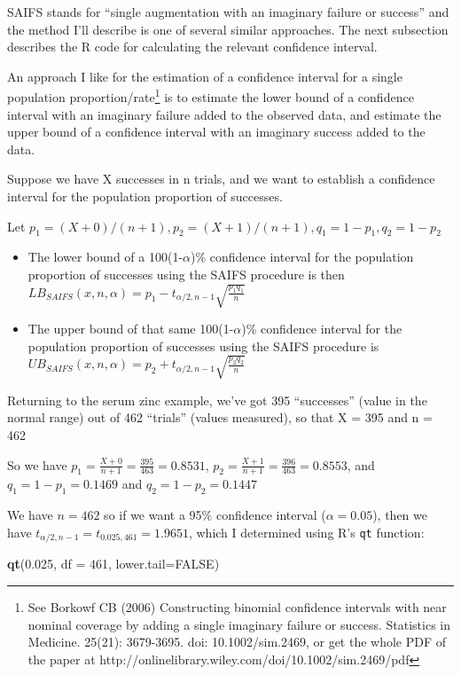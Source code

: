 \documentclass[
]{book}
\newenvironment{Shaded}{\begin{snugshade}}{\end{snugshade}}
\newcommand{\DataTypeTok}[1]{\textcolor[rgb]{0.13,0.29,0.53}{#1}}
\newcommand{\DecValTok}[1]{\textcolor[rgb]{0.00,0.00,0.81}{#1}}
\newcommand{\FloatTok}[1]{\textcolor[rgb]{0.00,0.00,0.81}{#1}}
\newcommand{\KeywordTok}[1]{\textcolor[rgb]{0.13,0.29,0.53}{\textbf{#1}}}
\newcommand{\NormalTok}[1]{#1}
\newcommand{\OtherTok}[1]{\textcolor[rgb]{0.56,0.35,0.01}{#1}}
\begin{document}
SAIFS stands for ``single augmentation with an imaginary failure or success'' and the method I'll describe is one of several similar approaches. The next subsection describes the R code for calculating the relevant confidence interval.

An approach I like for the estimation of a confidence interval for a single population proportion/rate\footnote{See Borkowf CB (2006) Constructing binomial confidence intervals with near nominal coverage by adding a single imaginary failure or success. Statistics in Medicine. 25(21): 3679-3695. doi: 10.1002/sim.2469, or get the whole PDF of the paper at http://onlinelibrary.wiley.com/doi/10.1002/sim.2469/pdf} is to estimate the lower bound of a confidence interval with an imaginary failure added to the observed data, and estimate the upper bound of a confidence interval with an imaginary success added to the data.

Suppose we have X successes in n trials, and we want to establish a confidence interval for the population proportion of successes.

Let \(p_1 = (X+0)/(n+1), p_2 = (X+1)/(n+1), q_1 = 1 - p_1, q_2 = 1 - p_2\)

\begin{itemize}
\item
  The lower bound of a 100(1-\(\alpha\))\% confidence interval for the population proportion of successes using the SAIFS procedure is then \(LB_{SAIFS}(x,n,\alpha) = p_1 - t_{\alpha/2, n-1}\sqrt{\frac{p_1 q_1}{n}}\)
\item
  The upper bound of that same 100(1-\(\alpha\))\% confidence interval for the population proportion of successes using the SAIFS procedure is \(UB_{SAIFS}(x,n,\alpha) = p_2 + t_{\alpha/2, n-1}\sqrt{\frac{p_2 q_2}{n}}\)
\end{itemize}

Returning to the serum zinc example, we've got 395 ``successes'' (value in the normal range) out of 462 ``trials'' (values measured), so that X = 395 and n = 462

So we have \(p_1 = \frac{X + 0}{n + 1} = \frac{395}{463} = 0.8531\), \(p_2 = \frac{X + 1}{n + 1} = \frac{396}{463} = 0.8553\), and \(q_1 = 1 - p_1 = 0.1469\) and \(q_2 = 1 - p_2 = 0.1447\)

We have \(n = 462\) so if we want a 95\% confidence interval (\(\alpha = 0.05\)), then we have \(t_{\alpha/2, n-1} = t_{0.025, 461} = 1.9651\), which I determined using R's \texttt{qt} function:

\begin{Shaded}
\begin{Highlighting}[]
\KeywordTok{qt}\NormalTok{(}\FloatTok{0.025}\NormalTok{, }\DataTypeTok{df =} \DecValTok{461}\NormalTok{, }\DataTypeTok{lower.tail=}\OtherTok{FALSE}\NormalTok{)}
\end{Highlighting}
\end{Shaded}
\end{document}
